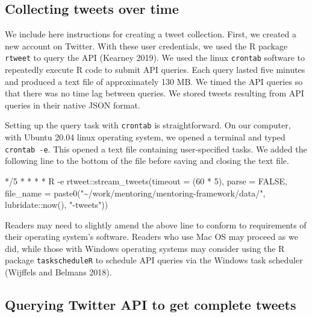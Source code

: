 \documentclass[
]{article}
\newenvironment{Shaded}{\begin{snugshade}}{\end{snugshade}}
\newcommand{\ExtensionTok}[1]{#1}
\newcommand{\NormalTok}[1]{#1}
\newcommand{\StringTok}[1]{\textcolor[rgb]{0.31,0.60,0.02}{#1}}
\begin{document}
\hypertarget{collecting-tweets-over-time}{%
\subsection{Collecting tweets over time}\label{collecting-tweets-over-time}}

We include here instructions for creating a tweet collection. First, we created a
new account on Twitter. With these user credentials, we used the
R package \texttt{rtweet} to query the API (Kearney 2019). We used the linux \texttt{crontab} software
to repeatedly execute R code to submit API queries. Each
query lasted five minutes and produced a text file of approximately 130 MB. We timed the API queries so
that there was no time lag between queries. We stored tweets resulting from API queries in their native JSON format.

Setting up the query task with \texttt{crontab} is straightforward. On our computer, with
Ubuntu 20.04 linux operating system, we opened a terminal and typed \texttt{crontab\ -e}. This
opened a text file containing user-specified tasks. We added the following line to the
bottom of the file before saving and closing the text file.

\begin{Shaded}
\begin{Highlighting}[]
\ExtensionTok{*/5}\NormalTok{ * * * * R {-}e }\StringTok{\textquotesingle{}rtweet::stream\_tweets(timeout = (60 * 5), }
\StringTok{parse = FALSE, file\_name = paste0("\textasciitilde{}/work/mentoring/mentoring{-}framework/data/",}
\StringTok{lubridate::now(), "{-}tweets"))\textquotesingle{}}
\end{Highlighting}
\end{Shaded}

Readers may need to slightly amend the above line to conform to requirements of
their operating system's software. Readers who use Mac OS may proceed as we did,
while those with Windows operating systems may consider using the R package
\texttt{taskscheduleR} to schedule API queries via the Windows task scheduler (Wijffels and Belmans 2018).

\hypertarget{querying-twitter-api-to-get-complete-tweets}{%
\subsection{Querying Twitter API to get complete tweets}\label{querying-twitter-api-to-get-complete-tweets}}
\end{document}
